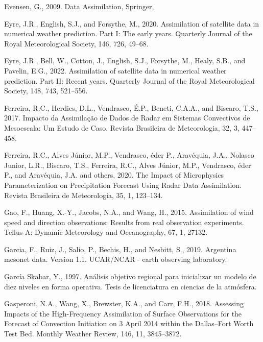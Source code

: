 \documentclass[12pt,oneside,a4paper]{reedthesis}
\begin{document}
\leavevmode\hypertarget{ref-evensen2009}{}%
Evensen, G., 2009. Data Assimilation, Springer,

\leavevmode\hypertarget{ref-eyre2020}{}%
Eyre, J.R., English, S.J., and Forsythe, M., 2020. Assimilation of satellite data in numerical weather prediction. Part I: The early years. Quarterly Journal of the Royal Meteorological Society, 146, 726, 49--68.

\leavevmode\hypertarget{ref-eyre2022}{}%
Eyre, J.R., Bell, W., Cotton, J., English, S.J., Forsythe, M., Healy, S.B., and Pavelin, E.G., 2022. Assimilation of satellite data in numerical weather prediction. Part II: Recent years. Quarterly Journal of the Royal Meteorological Society, 148, 743, 521--556.

\leavevmode\hypertarget{ref-ferreira2017}{}%
Ferreira, R.C., Herdies, D.L., Vendrasco, É.P., Beneti, C.A.A., and Biscaro, T.S., 2017. Impacto da Assimilação de Dados de Radar em Sistemas Convectivos de Mesoescala: Um Estudo de Caso. Revista Brasileira de Meteorologia, 32, 3, 447--458.

\leavevmode\hypertarget{ref-ferreira2020}{}%
Ferreira, R.C., Alves Júnior, M.P., Vendrasco, éder P., Aravéquia, J.A., Nolasco Junior, L.R., Biscaro, T.S., Ferreira, R.C., Alves Júnior, M.P., Vendrasco, éder P., and Aravéquia, J.A. and others, 2020. The Impact of Microphysics Parameterization on Precipitation Forecast Using Radar Data Assimilation. Revista Brasileira de Meteorologia, 35, 1, 123--134.

\leavevmode\hypertarget{ref-gao2015}{}%
Gao, F., Huang, X.-Y., Jacobs, N.A., and Wang, H., 2015. Assimilation of wind speed and direction observations: Results from real observation experiments. Tellus A: Dynamic Meteorology and Oceanography, 67, 1, 27132.

\leavevmode\hypertarget{ref-garcia2019}{}%
Garcia, F., Ruiz, J., Salio, P., Bechis, H., and Nesbitt, S., 2019. Argentina mesonet data. Version 1.1. UCAR/NCAR - earth observing laboratory.

\leavevmode\hypertarget{ref-garciaskabar1997}{}%
García Skabar, Y., 1997. Análisis objetivo regional para inicializar un modelo de diez niveles en forma operativa. Tesis de licenciatura en ciencias de la atmósfera.

\leavevmode\hypertarget{ref-gasperoni2018}{}%
Gasperoni, N.A., Wang, X., Brewster, K.A., and Carr, F.H., 2018. Assessing Impacts of the High-Frequency Assimilation of Surface Observations for the Forecast of Convection Initiation on 3 April 2014 within the Dallas--Fort Worth Test Bed. Monthly Weather Review, 146, 11, 3845--3872.
\end{document}
